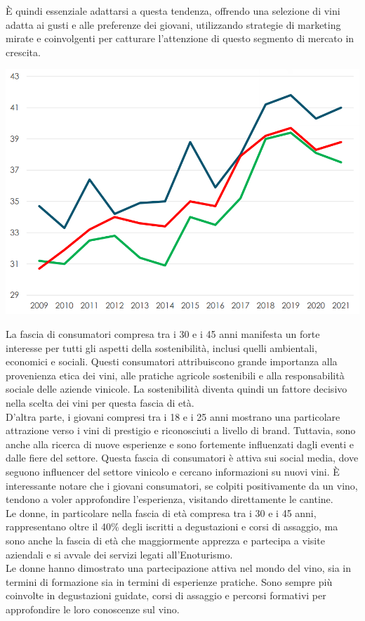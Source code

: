\documentclass[12pt, a4paper]{article}
\newcommand{\meskip}{\medskip \\}
\begin{document}
È quindi essenziale adattarsi a questa tendenza, offrendo una selezione di vini adatta ai gusti e alle preferenze dei giovani, utilizzando strategie di marketing mirate e coinvolgenti per catturare l'attenzione di questo segmento di mercato in crescita.\smallskip
\begin{center}
    \includegraphics[width=.85\textwidth]{images/consumo_vino_eta.png}
\end{center}
La fascia di consumatori compresa tra i 30 e i 45 anni manifesta un forte interesse per tutti gli aspetti della sostenibilità, inclusi quelli ambientali, economici e sociali. Questi consumatori attribuiscono grande importanza alla provenienza etica dei vini, alle pratiche agricole sostenibili e alla responsabilità sociale delle aziende vinicole. La sostenibilità diventa quindi un fattore decisivo nella scelta dei vini per questa fascia di età.\meskip
D'altra parte, i giovani compresi tra i 18 e i 25 anni mostrano una particolare attrazione verso i vini di prestigio e riconosciuti a livello di brand. Tuttavia, sono anche alla ricerca di nuove esperienze e sono fortemente influenzati dagli eventi e dalle fiere del settore. Questa fascia di consumatori è attiva sui social media, dove seguono influencer del settore vinicolo e cercano informazioni su nuovi vini. È interessante notare che i giovani consumatori, se colpiti positivamente da un vino, tendono a voler approfondire l'esperienza, visitando direttamente le cantine.\meskip
Le donne, in particolare nella fascia di età compresa tra i 30 e i 45 anni, rappresentano oltre il 40\% degli iscritti a degustazioni e corsi di assaggio, ma sono anche la fascia di età che maggiormente apprezza e partecipa a visite aziendali e si avvale dei servizi legati all'Enoturismo.\meskip
Le donne hanno dimostrato una partecipazione attiva nel mondo del vino, sia in termini di formazione sia in termini di esperienze pratiche. Sono sempre più coinvolte in degustazioni guidate, corsi di assaggio e percorsi formativi per approfondire le loro conoscenze sul vino.
\end{document}
